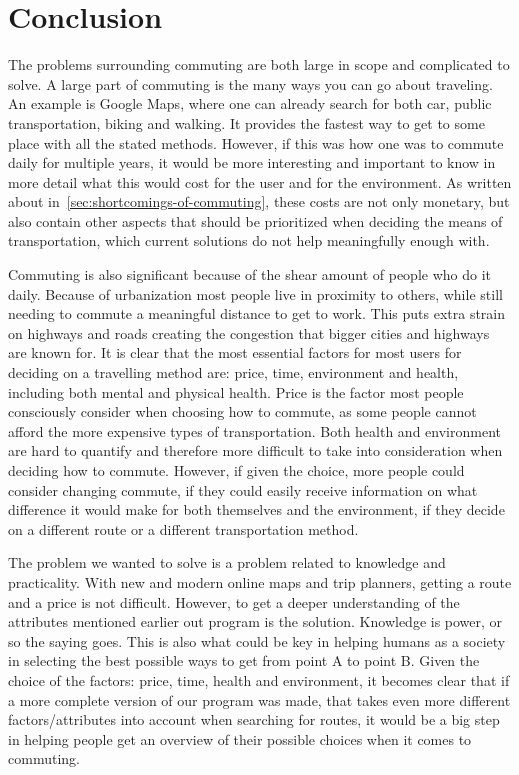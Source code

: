 \chapter{Conclusion}\label{ch:conclusion}

The problems surrounding commuting are both large in scope and complicated to solve.
A large part of commuting is the many ways you can go about traveling.
An example is Google Maps, where one can already search for both car, public transportation, biking and walking.
It provides the fastest way to get to some place with all the stated methods.
However, if this was how one was to commute daily for multiple years, it would be more interesting and important to know
in more detail what this would cost for the user and for the environment.
As written about in~\ref{sec:shortcomings-of-commuting}, these costs are not only monetary, but also contain other
aspects that should be prioritized when deciding the means of transportation, which current solutions do not help
meaningfully enough with.

Commuting is also significant because of the shear amount of people who do it daily.
Because of urbanization most people live in proximity to others, while still needing to commute a meaningful distance to
get to work.
This puts extra strain on highways and roads creating the congestion that bigger cities and highways are known for.
It is clear that the most essential factors for most users for deciding on a travelling method are: price, time,
environment and health, including both mental and physical health.
Price is the factor most people consciously consider when choosing how to commute, as some people cannot afford the
more expensive types of transportation.
Both health and environment are hard to quantify and therefore more difficult to take into consideration when deciding
how to commute.
However, if given the choice, more people could consider changing commute, if they could easily receive information on
what difference it would make for both themselves and the environment, if they decide on a different route or a
different transportation method.

The problem we wanted to solve is a problem related to knowledge and practicality.
With new and modern online maps and trip planners, getting a route and a price is not difficult.
However, to get a deeper understanding of the attributes mentioned earlier out program is the solution.
Knowledge is power, or so the saying goes.
This is also what could be key in helping humans as a society in selecting the best possible ways to get from point A to
point B\@.
Given the choice of the factors: price, time, health and environment, it becomes clear that if a more complete version
of our program was made, that takes even more different factors/attributes into account when searching for routes, it
would be a big step in helping people get an overview of their possible choices when it comes
to commuting.
